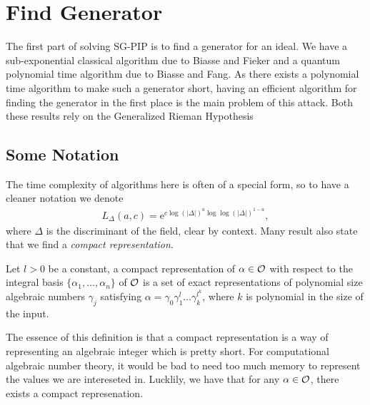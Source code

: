 \section{Find Generator}
The first part of solving SG-PIP is to find a generator for an ideal. We have a sub-exponential classical algorithm due to Biasse and Fieker\cite{Find Generator Classic} and a quantum polynomial time algorithm due to Biasse and Fang\cite{Find Generator Quantum}. As there exists a polynomial time algorithm to make such a generator short, having an efficient algorithm for finding the generator in the first place is the main problem of this attack. Both these results rely on the Generalized Rieman Hypothesis

\subsection{Some Notation}
The time complexity of algorithms here is often of a special form, so to have a cleaner notation we denote
\begin{align*}
    L_\Delta (a, c) = \text{e}^{c\log(|\Delta |)^a \log \log (|\Delta |)^{1 - a}},
\end{align*}
where \(\Delta\) is the discriminant of the field, clear by context. Many result also state that we find a \emph{compact representation}. 
\begin{definition}
    Let \(l > 0\) be a constant, a compact representation of \(\alpha\in\mathcal{O}\) with respect to the integral basis \(\{\alpha_1, \dots ,\alpha_n\}\) of \(\mathcal{O}\) is a set of exact representations of polynomial size algebraic numbers \(\gamma_j\) satisfying \(\alpha = \gamma_0\gamma_1^{l}\dots\gamma_k^{l^k}\), where \(k\) is polynomial in the size of the input. 
\end{definition}
The essence of this definition is that a compact representation is a way of representing an algebraic integer which is pretty short. For computational algebraic number theory, it would be bad to need too much memory to represent the values we are intereseted in. Lucklily, we have that for any \(\alpha\in\mathcal{O}\), there exists a compact represenation\cite{Compact Representation}.
